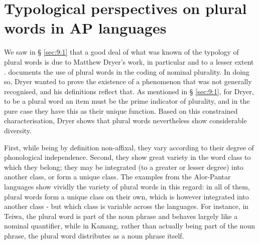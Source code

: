 \section{Typological perspectives on plural words in AP languages} %
\label{sec:9:5}
We saw in {\S} \ref{sec:9:1} that a good deal of what was known of the typology of plural words is due to Matthew Dryer's work, in particular \citet{Dryer1989,Dryer2011} and to a lesser extent \citet{Dryer2007}. \citet{Dryer2011} documents the use of plural words in the coding of nominal plurality. In doing so, Dryer wanted to prove the existence of a phenomenon that was not generally recognised, and his definitions reflect that. As mentioned in {\S} \ref{sec:9:1}, for Dryer, to be a plural word an item must be the prime indicator of plurality, and in the pure case they have this as their unique function. Based on this constrained characterisation, Dryer shows that plural words nevertheless show considerable diversity.

 First, while being by definition non-affixal, they vary according to their degree of phonological independence. Second, they show great variety in the word class to which they belong; they may be integrated (to a greater or lesser degree) into another class, or form a unique class. The examples from the Alor-Pantar languages show vividly the variety of plural words in this regard: in all of them, plural words form a unique class on their own, which is however integrated into another class - but which class is variable across the languages. For instance, in Teiwa, the plural word is part of the noun phrase and behaves largely like a nominal quantifier, while in Kamang, rather than actually being part of the noun phrase, the plural word distributes as a noun phrase itself.

